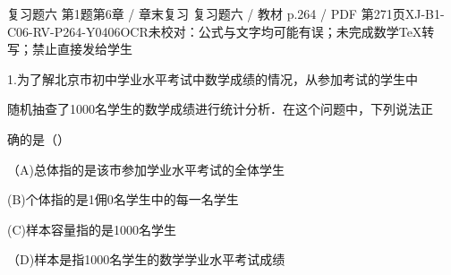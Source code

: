 \begin{bankitem}{复习题六 第1题}{第6章 / 章末复习 复习题六 / 教材 p.264 / PDF 第271页}{XJ-B1-C06-RV-P264-Y0406}{OCR未校对：公式与文字均可能有误；未完成数学TeX转写；禁止直接发给学生}
\begin{ocrdraft}
\par
1.为了解北京市初中学业水平考试中数学成绩的情况，从参加考试的学生中
\par
随机抽查了1000名学生的数学成绩进行统计分析．在这个问题中，下列说法正
\par
确的是（）
\par
（A)总体指的是该市参加学业水平考试的全体学生
\par
(B)个体指的是1佣0名学生中的每一名学生
\par
(C)样本容量指的是1000名学生
\par
（D)样本是指1000名学生的数学学业水平考试成绩
\end{ocrdraft}
\end{bankitem}
